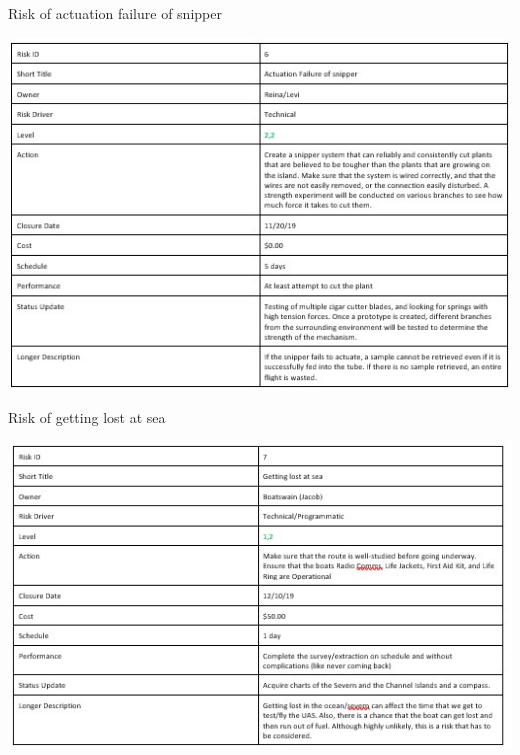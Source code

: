\documentclass{wrcecapstone}
\begin{document}
\begin{table}
\caption{Risk of actuation failure of snipper}
\label{tab:8.3.1f}
\includegraphics[width=\columnwidth]{figures/table-831f.jpg}
\end{table}

\begin{table}
\caption{Risk of getting lost at sea}
\label{tab:8.3.1g}
\includegraphics[width=\columnwidth]{figures/table-831g.jpg}
\end{table}
\end{document}
